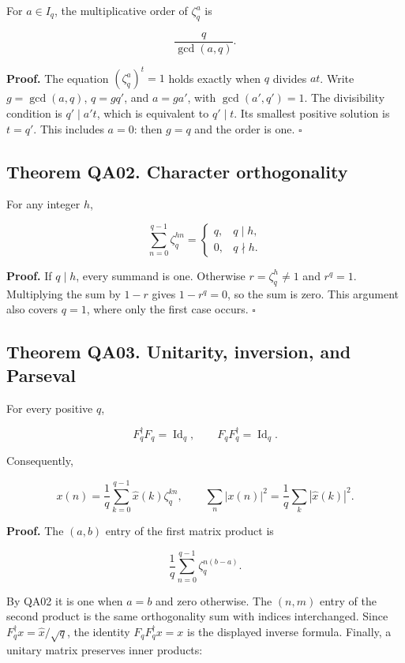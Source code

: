 For \(a\in I_q\), the multiplicative order of \(\zeta_q^a\) is

\[
\frac q{\gcd(a,q)}.
\]

\textbf{Proof.} The equation \((\zeta_q^a)^t=1\) holds exactly when
\(q\) divides \(at\). Write \(g=\gcd(a,q)\), \(q=gq'\), and \(a=ga'\),
with \(\gcd(a',q')=1\). The divisibility condition is \(q'\mid a't\),
which is equivalent to \(q'\mid t\). Its smallest positive solution is
\(t=q'\). This includes \(a=0\): then \(g=q\) and the order is one.
\(\square\)

\hypertarget{theorem-qa02.-character-orthogonality}{%
\subsection*{Theorem QA02. Character
orthogonality}\label{theorem-qa02.-character-orthogonality}}

For any integer \(h\),

\[
\sum_{n=0}^{q-1}\zeta_q^{hn}
=\begin{cases}q,&q\mid h,\\0,&q\nmid h.\end{cases}
\]

\textbf{Proof.} If \(q\mid h\), every summand is one. Otherwise
\(r=\zeta_q^h\ne1\) and \(r^q=1\). Multiplying the sum by \(1-r\) gives
\(1-r^q=0\), so the sum is zero. This argument also covers \(q=1\),
where only the first case occurs. \(\square\)

\hypertarget{theorem-qa03.-unitarity-inversion-and-parseval}{%
\subsection*{Theorem QA03. Unitarity, inversion, and
Parseval}\label{theorem-qa03.-unitarity-inversion-and-parseval}}

For every positive \(q\),

\[
F_q^\dagger F_q=\operatorname{Id}_q,
\qquad F_qF_q^\dagger=\operatorname{Id}_q.
\]

Consequently,

\[
x(n)=\frac1q\sum_{k=0}^{q-1}\widehat{x}(k)\zeta_q^{kn},
\qquad
\sum_n|x(n)|^2=\frac1q\sum_k|\widehat{x}(k)|^2.
\]

\textbf{Proof.} The \((a,b)\) entry of the first matrix product is

\[
\frac1q\sum_{n=0}^{q-1}\zeta_q^{n(b-a)}.
\]

By QA02 it is one when \(a=b\) and zero otherwise. The \((n,m)\) entry
of the second product is the same orthogonality sum with indices
interchanged. Since \(F_q^\dagger x=\widehat{x}/\sqrt q\), the identity
\(F_qF_q^\dagger x=x\) is the displayed inverse formula. Finally, a
unitary matrix preserves inner products:

